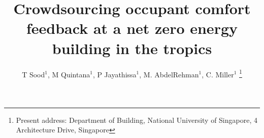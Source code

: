 \documentclass[a4paper]{jpconf} %
\begin{document}



\title{Crowdsourcing occupant comfort feedback at a net zero energy building in the tropics} 

\author{ T Sood$^1$, M Quintana$^1$,
P Jayathissa$^1$, M. AbdelRehman$^1$, C. Miller$^1$ \footnote[4]{Present address:
Department of Building, National University of Singapore, 4 Architecture Drive, Singapore}}
\address{$^1$ Building and Urban Data Science Group,  Department of Building, Singapore}









\end{document}
